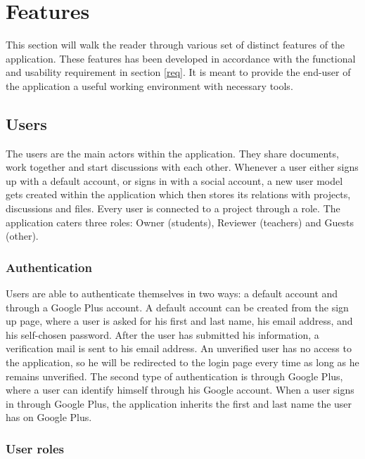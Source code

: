 \chapter{Features}
This section will walk the reader through various set of distinct features of the application. These features has been developed in accordance with the functional and usability requirement in section \ref{req}. It is meant to provide the end-user of the application a useful working environment with necessary tools.

\section{Users}

The users are the main actors within the application. They share documents, work together and start discussions with each other. Whenever
a user either signs up with a default account, or signs in with a social account, a new user model gets created within the application which then
stores its relations with projects, discussions and files. Every user is connected to a project through a role. The application caters three roles: 
Owner (students), Reviewer (teachers) and Guests (other).

\subsection{Authentication}

Users are able to authenticate themselves in two ways: a default account and through a Google Plus account. A default account can be created from the 
sign up page, where a user is asked for his first and last name, his email address, and his self-chosen password. After the user has submitted his 
information, a verification mail is sent to his email address. An unverified user has no access to the application, so he will be redirected to the 
login page every time as long as he remains unverified. The second type of authentication is through
Google Plus, where a user can identify himself through his Google account. When a user signs in through Google Plus, the application inherits
the first and last name the user has on Google Plus.

\subsection{User roles}

